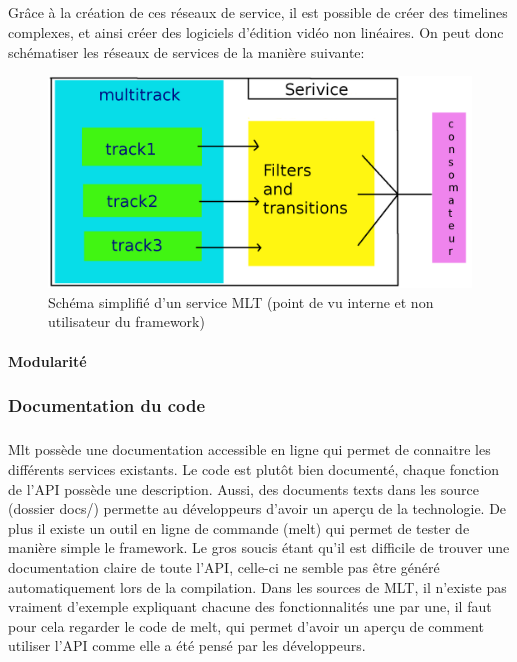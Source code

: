 \subparagraph{}

Grâce à la création de ces réseaux de service, il est possible de
créer des timelines complexes, et ainsi créer des logiciels d'édition
vidéo non linéaires. On peut donc schématiser les réseaux de services
de la manière suivante:

\begin{figure} [H]

  \begin{center}

    \includegraphics[width=1.0\textwidth]{images/service}

  \end{center}

  \caption{Schéma simplifié d'un service MLT (point de vu
  interne et
    non utilisateur du framework)}

  \label{Yes}

\end{figure}

\paragraph{Modularité}

\subsubsection{Documentation du code}

\subparagraph{}

Mlt possède une documentation accessible en ligne qui permet de connaitre
les différents services existants. Le code est plutôt bien documenté,
chaque fonction de l'API possède une description. Aussi, des documents
texts dans les source (dossier docs/) permette au développeurs d'avoir un
aperçu de la technologie. De plus il existe un outil en ligne de commande
(melt) qui permet de tester de manière simple le framework. Le gros
soucis étant qu'il est difficile de trouver une documentation claire de
toute l'API, celle-ci ne semble pas être généré automatiquement lors
de la compilation. Dans les sources de MLT, il n'existe pas
vraiment d'exemple expliquant chacune des fonctionnalités une par une,
il faut pour cela regarder le code de melt, qui permet d'avoir un aperçu
de comment utiliser l'API comme elle a été pensé par les développeurs.

